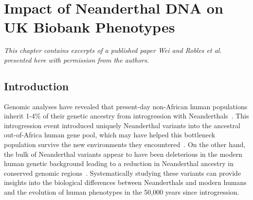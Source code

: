 \chapter{Impact of Neanderthal DNA on UK Biobank Phenotypes}
\textit{This chapter contains excerpts of a published paper Wei and Robles et al.~\cite{wei2022lingering} presented here with permission from the authors.
}
\section{Introduction}
Genomic analyses have revealed that present-day non-African human populations inherit 1-4\% of their genetic ancestry from introgression with Neanderthals~\cite{green2010,prfer2014complete}. This introgression event introduced uniquely Neanderthal variants into the ancestral out-of-Africa human gene pool, which may have helped this bottleneck population survive the new environments they encountered~\cite{mendez2012at,abi-rached2011shaping, sankararaman2014genomic,vernot2014resurrecting,racimo2015evidence,gittelman2016archaic}. On the other hand, the bulk of Neanderthal variants appear to have been deleterious in the modern human genetic background leading to a reduction in Neanderthal ancestry in conserved genomic regions~\cite{sankararaman2014genomic,vernot2014resurrecting,harris2016genetic,juric2016strength,petr2019limits}. Systematically studying these variants can provide insights into the biological differences between Neanderthals and modern humans and the evolution of human phenotypes in the 50,000 years since introgression. 

